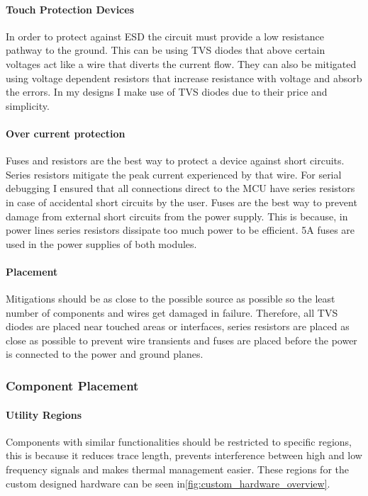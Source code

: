 \paragraph{Touch Protection Devices}
In order to protect against \gls{ESD} the circuit must provide a low resistance pathway to the ground. This can be using \gls{TVS} diodes that above certain voltages act like a wire that diverts the current flow. They can also be mitigated using voltage dependent resistors that increase resistance with voltage and absorb the errors.  In my designs I make use of \gls{TVS} diodes due to their price and simplicity. 
\paragraph{Over current protection}
Fuses and resistors are the best way to protect a device against short circuits. Series resistors mitigate the peak current experienced by that wire. For serial debugging I ensured that all connections direct to the \gls{MCU} have series resistors in case of accidental short circuits by the user. Fuses are the best way to prevent damage from external short circuits from the power supply. This is because, in power lines series resistors dissipate too much power to be efficient. 5A fuses are used in the power supplies of both modules. 
\paragraph{Placement}
Mitigations should be as close to the possible source as possible so the least number of components and wires get damaged in failure. Therefore, all \gls{TVS} diodes are placed near touched areas or interfaces, series resistors are placed as close as possible to prevent wire transients and fuses are placed before the power is connected to the power and ground planes.

\subsubsection{Component Placement}
\paragraph{Utility Regions}
Components with similar functionalities should be restricted to specific regions, this is because it reduces trace length, prevents interference between high and low frequency signals and makes thermal management easier. These regions for the custom designed hardware can be seen in\ref{fig:custom_hardware_overview}. 
